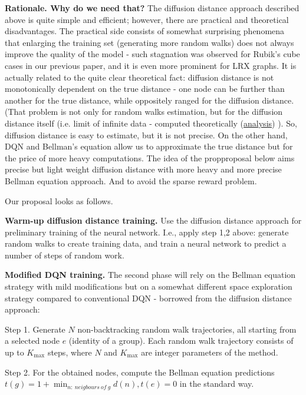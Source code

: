 \documentclass[atmp]{ipart_v1}
\numberwithin{equation}{section}
\theoremstyle{plain}%
\begin{document}
{\bf Rationale. Why do we need that?} The diffusion distance approach described above is quite simple and efficient; however, there are practical and theoretical disadvantages. The practical side consists of somewhat surprising phenomena that enlarging the training set (generating more random walks) does not always improve the quality of the model - such stagnation was observed for Rubik's cube cases in our previous paper, and it is even more prominent for LRX graphs. It is actually related to the quite clear theoretical fact: diffusion distance is not monotonically dependent on the true distance - one node can be further than another for the true distance, while oppositely ranged for the diffusion distance. (That problem is not only for random walks estimation, but for the diffusion distance itself (i.e. limit of infinite data - computed theoretically (\href{https://www.kaggle.com/code/fedmug/lrx-diffusion-distance-analysis}{analysis}) ). %
So, diffusion distance is easy to estimate, but it is not precise. On the other hand, DQN and Bellman's equation allow us to approximate the true distance but for the price of more heavy computations. 
The idea of the propproposal below aims precise but light weight diffusion distance with more heavy and more precise Bellman equation approach. And to avoid the sparse reward problem.

Our proposal looks as follows.

{\bf Warm-up diffusion distance training. } Use the diffusion distance approach for preliminary training of the neural network. I.e., apply step 1,2 above: generate random walks to create training data, and train a neural network to predict a number of steps of random work.

{\bf Modified DQN training. }
The second phase will rely on the Bellman equation strategy with mild modifications but on a somewhat different space exploration strategy compared to conventional DQN - borrowed from the diffusion distance approach:

Step 1. Generate $N$ non-backtracking random walk trajectories, all starting from a selected node $e$ (identity of a group). Each random walk trajectory consists of up to $K_{\text{max}}$ steps, where $N$ and $K_{\text{max}}$ are integer parameters of the method. 

Step 2. For the obtained nodes, compute the Bellman equation predictions
$t(g) = 1+\min_{n:~neigbours~of~g} d(n), t(e) =0$ in the standard way. 
\end{document}

